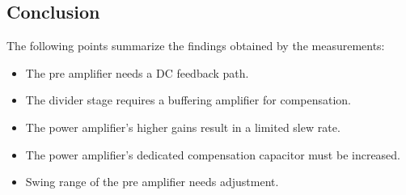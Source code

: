 \subsection{Conclusion}
\label{subsec:amplifiers-conclusion}

The following points summarize the findings obtained by the measurements:
\begin{itemize}[topsep=8pt,itemsep=4pt,partopsep=4pt, parsep=4pt]
    \item The pre amplifier needs a DC feedback path.
    \item The divider stage requires a buffering amplifier for compensation.
    \item The power amplifier's higher gains result in a limited slew rate.

    \item The power amplifier's dedicated compensation capacitor must be
    increased.
    \item Swing range of the pre amplifier needs adjustment.
\end{itemize}

\clearpage
